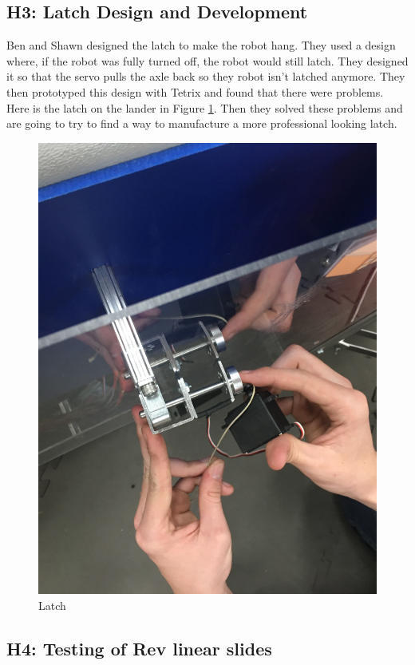 \documentclass{article}
\begin{document}
\subsection{H3: Latch Design and Development}

Ben and Shawn designed the latch to make the robot hang. They used a design where, if the robot was fully turned off, the robot would still latch. They designed it so that the servo pulls the axle back so they robot isn't latched anymore. They then prototyped this design with Tetrix and found that there were problems. Here is the latch on the lander in Figure \ref{fig:latch1}. Then they solved these problems and are going to try to find a way to manufacture a more professional looking latch.

\begin{figure}
    \centering
    \includegraphics[width=.6 \textwidth]{13_11-26/images/latchservo.JPG}
    \caption{Latch}
    \label{fig:latch1}
\end{figure}


\subsection{H4: Testing of Rev linear slides}
\end{document}

